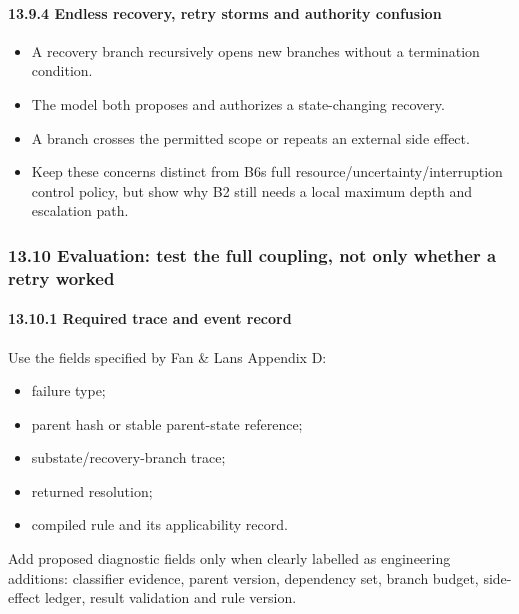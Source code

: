 \paragraph{13.9.4 Endless recovery, retry storms and authority confusion}\label{1394-endless-recovery-retry-storms-and-authority-confusion}

\begin{itemize}
\tightlist
\item
  A recovery branch recursively opens new branches without a termination condition.
\item
  The model both proposes and authorizes a state-changing recovery.
\item
  A branch crosses the permitted scope or repeats an external side effect.
\item
  Keep these concerns distinct from B6\textquotesingle s full resource/uncertainty/interruption control policy, but show why B2 still needs a local maximum depth and escalation path.
\end{itemize}

\subsubsection{13.10 Evaluation: test the full coupling, not only whether a retry worked}\label{1310-evaluation-test-the-full-coupling-not-only-whether-a-retry-worked}

\paragraph{13.10.1 Required trace and event record}\label{13101-required-trace-and-event-record}

Use the fields specified by Fan \& Lan\textquotesingle s Appendix D:

\begin{itemize}
\tightlist
\item
  failure type;
\item
  parent hash or stable parent-state reference;
\item
  substate/recovery-branch trace;
\item
  returned resolution;
\item
  compiled rule and its applicability record.
\end{itemize}

Add proposed diagnostic fields only when clearly labelled as engineering additions: classifier evidence, parent version, dependency set, branch budget, side-effect ledger, result validation and rule version.

